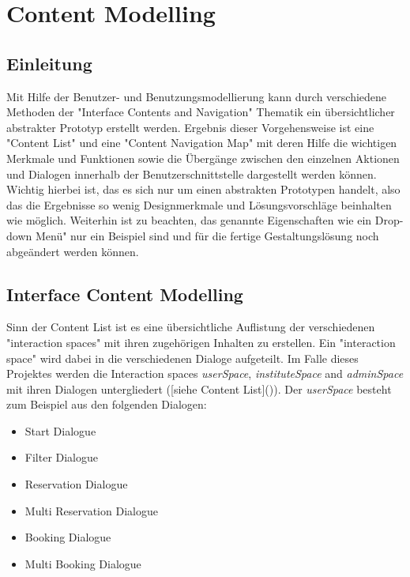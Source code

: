 \section{Content Modelling}
\label{sec:Content_Modelling}

\subsection{Einleitung}
\label{sec:Content_Modelling_Einleitung}

Mit Hilfe der Benutzer- und Benutzungsmodellierung kann durch verschiedene
Methoden der "Interface Contents and Navigation" Thematik ein übersichtlicher
abstrakter Prototyp erstellt werden. Ergebnis dieser Vorgehensweise ist
eine "Content List" und eine "Content Navigation Map" mit deren Hilfe die
wichtigen Merkmale und Funktionen sowie die Übergänge zwischen den einzelnen
Aktionen und Dialogen innerhalb der Benutzerschnittstelle dargestellt werden
können.  
Wichtig hierbei ist, das es sich nur um einen abstrakten Prototypen handelt, also
das die Ergebnisse so wenig Designmerkmale und Lösungsvorschläge beinhalten wie
möglich. Weiterhin ist zu beachten, das genannte Eigenschaften wie ein
Drop-down Menü" nur ein Beispiel sind und für die fertige Gestaltungslösung noch
abgeändert werden können.

\subsection{Interface Content Modelling}
\label{sec:Interface_Content_Modelling}

Sinn der Content List ist es eine übersichtliche Auflistung der verschiedenen
"interaction spaces" mit ihren zugehörigen Inhalten zu erstellen.
Ein "interaction space" wird dabei in die verschiedenen Dialoge aufgeteilt.
Im Falle dieses Projektes werden die Interaction spaces \textit{userSpace},
\textit{instituteSpace} and \textit{adminSpace} mit ihren Dialogen
untergliedert ([siehe Content List]()).  
Der \textit{userSpace} besteht zum Beispiel aus den folgenden Dialogen:

\begin{itemize}
	\item Start Dialogue
	\item Filter Dialogue
	\item Reservation Dialogue
	\item Multi Reservation Dialogue
	\item Booking Dialogue
	\item Multi Booking Dialogue
\end{itemize}

